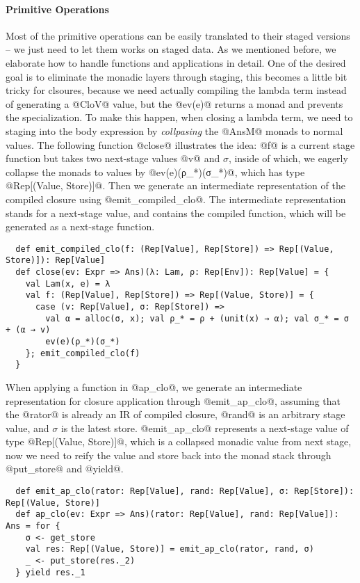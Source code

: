 \paragraph{Primitive Operations} Most of the primitive operations can be easily
translated to their staged versions -- we just need to let them works on staged data.
As we mentioned before, we elaborate how to handle functions and applications in
detail. One of the desired goal is to eliminate the monadic layers through
staging, this becomes a little bit tricky for clsoures, because we need actually
compiling the lambda term instead of generating a @CloV@ value, but the @ev(e)@
returns a monad and prevents the specialization. To make this happen, when
closing a lambda term, we need to staging into the body expression by
\textit{collpasing} the @AnsM@ monads to normal values. The
following function @close@ illustrates the idea: @f@ is a current stage function
but takes two next-stage values @v@ and $\sigma$, inside of which, we eagerly
collapse the monads to values by @ev(e)(ρ_*)(σ_*)@, which has type
@Rep[(Value, Store)]@. Then we generate an intermediate representation of the compiled
closure using @emit_compiled_clo@. The intermediate representation stands for a
next-stage value, and contains the compiled function, which will be generated as
a next-stage function.

\begin{lstlisting}
  def emit_compiled_clo(f: (Rep[Value], Rep[Store]) => Rep[(Value, Store)]): Rep[Value]
  def close(ev: Expr => Ans)(λ: Lam, ρ: Rep[Env]): Rep[Value] = {
    val Lam(x, e) = λ
    val f: (Rep[Value], Rep[Store]) => Rep[(Value, Store)] = {
      case (v: Rep[Value], σ: Rep[Store]) =>
        val α = alloc(σ, x); val ρ_* = ρ + (unit(x) → α); val σ_* = σ + (α → v)
        ev(e)(ρ_*)(σ_*)
    }; emit_compiled_clo(f)
  }
\end{lstlisting}

When applying a function in @ap_clo@, we generate an intermediate representation
for closure application through @emit_ap_clo@, assuming that the @rator@ is already an
IR of compiled closure, @rand@ is an arbitrary stage value, and $\sigma$ is the
latest store. @emit_ap_clo@ represents a next-stage value of type
@Rep[(Value, Store)]@, which is a collapsed monadic value from next stage, now
we need to reify the value and store back into the monad stack through
@put_store@ and @yield@.

\begin{lstlisting}
  def emit_ap_clo(rator: Rep[Value], rand: Rep[Value], σ: Rep[Store]): Rep[(Value, Store)]
  def ap_clo(ev: Expr => Ans)(rator: Rep[Value], rand: Rep[Value]): Ans = for {
    σ <- get_store
    val res: Rep[(Value, Store)] = emit_ap_clo(rator, rand, σ)
    _ <- put_store(res._2)
  } yield res._1
\end{lstlisting}

